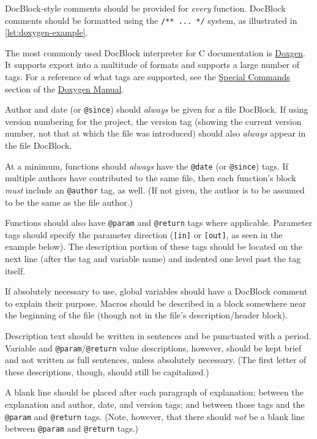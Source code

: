 \documentclass[StyleGuide.tex]{subfiles}
\begin{document}
DocBlock-style comments should be provided for \emph{every} function.
DocBlock comments should be formatted using the \texttt{/**\ ...\ */}
system, as illustrated in \autoref{lst:doxygen-example}.

The most commonly used DocBlock interpreter for C documentation is
\href{http://www.stack.nl/~dimitri/doxygen/}{Doxgen}. It supports export
into a multitude of formats and supports a large number of tags. For a
reference of what tags are supported, see the
\href{http://www.stack.nl/~dimitri/doxygen/manual/commands.html}{Special
Commands} section of the
\href{http://www.stack.nl/~dimitri/doxygen/manual/index.html}{Doxygen
Manual}.

Author and date (or \texttt{@since}) should \emph{always} be given for a
file DocBlock. If using version numbering for the project, the version
tag (showing the current version number, not that at which the file was
introduced) should also \emph{always} appear in the file DocBlock.

At a minimum, functions should \emph{always} have the \texttt{@date} (or
\texttt{@since}) tags. If multiple authors have contributed to the same
file, then each function's block \emph{must} include an \texttt{@author}
tag, as well. (If not given, the author is to be assumed to be the same
as the file author.)

Functions should also have \texttt{@param} and \texttt{@return} tags
where applicable. Parameter tags should specify the parameter direction
(\texttt{{[}in{]}} or \texttt{{[}out{]}}, as seen in the example below).
The description portion of these tags should be located on the next line
(after the tag and variable name) and indented one level past the tag
itself.

If absolutely necessary to use, global variables should have a DocBlock
comment to explain their purpose. Macros should be described in a block
somewhere near the beginning of the file (though not in the file's
description/header block).

Description text should be written in sentences and be punctuated with a
period. Variable and \texttt{@param}/\texttt{@return} value
descriptions, however, should be kept brief and not written as full
sentences, unless absolutely necessary. (The first letter of these
descriptions, though, should still be capitalized.)

A blank line should be placed after each paragraph of explanation;
between the explanation and author, date, and version tags; and between
those tags and the \texttt{@param} and \texttt{@return} tags. (Note,
however, that there should \emph{not} be a blank line between
\texttt{@param} and \texttt{@return} tags.)
\end{document}
